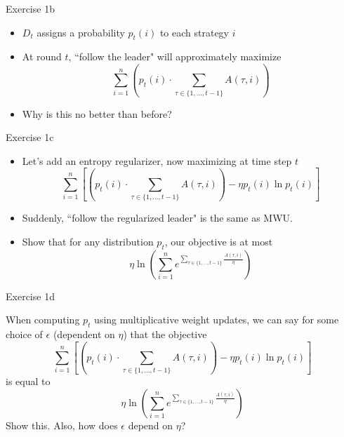 \documentclass[10pt]{beamer}
\begin{document}
\begin{frame}[fragile]{Exercise 1b}

\begin{itemize}
\item $D_t$ assigns a probability $p_t(i)$ to each strategy $i$
\item At round $t$, ``follow the leader" will approximately maximize
$$\sum_{i = 1}^n \left(p_t(i) \cdot \sum_{\tau \in \{1, ..., t - 1\}}A(\tau, i)\right)$$
\item Why is this no better than before?
\end{itemize}

\end{frame}

\begin{frame}[fragile]{Exercise 1c}

\begin{itemize}
\item Let's add an entropy regularizer, now maximizing at time step $t$
$$\sum_{i = 1}^n \left[\left(p_t(i) \cdot \sum_{\tau \in \{1, ..., t - 1\}}A(\tau, i)\right) - \eta p_t(i)\ln{p_t(i)}\right]$$
\item Suddenly, ``follow the regularized leader" is the same as MWU.
\item Show that for any distribution $p_t$, our objective is at most
$$\eta \ln{\left(\sum_{i = 1}^n e^{\sum_{\tau \in \{1, ..., t - 1\}}\frac{A(\tau, i)}{\eta}}\right)}$$
\end{itemize}

\end{frame}

\begin{frame}[fragile]{Exercise 1d}

When computing $p_t$ using multiplicative weight updates, we can say for some choice of $\epsilon$ (dependent on $\eta$) that the objective
$$\sum_{i = 1}^n \left[\left(p_t(i) \cdot \sum_{\tau \in \{1, ..., t - 1\}}A(\tau, i)\right) - \eta p_t(i)\ln{p_t(i)}\right]$$
is equal to
$$\eta \ln{\left(\sum_{i = 1}^n e^{\sum_{\tau \in \{1, ..., t - 1\}}\frac{A(\tau, i)}{\eta}}\right)}$$
Show this. Also, how does $\epsilon$ depend on $\eta$?

\end{frame}
\end{document}
